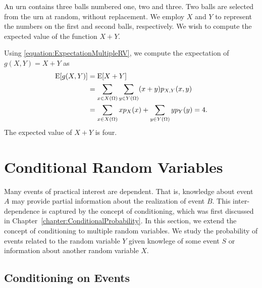 \begin{example}
An urn contains three balls numbered one, two and three.
Two balls are selected from the urn at random, without replacement.
We employ $X$ and $Y$ to represent the numbers on the first and second balls, respectively.
We wish to compute the expected value of the function $X + Y$.

Using \eqref{equation:ExpectationMultipleRV}, we compute the expectation of $g(X,Y) = X + Y$ as
\begin{equation*}
\begin{split}
\mathrm{E} [g(X,Y)] &= \mathrm{E} [X + Y] \\
&= \sum_{x \in X(\Omega)} \sum_{y \in Y(\Omega)} (x + y) p_{X,Y} (x,y) \\
&= \sum_{x \in X(\Omega)} x p_X (x) + \sum_{y \in Y(\Omega)} y p_Y (y)
= 4.
\end{split}
\end{equation*}
The expected value of $X + Y$ is four.
\end{example}


\section{Conditional Random Variables}
\label{section:ConditionalRandomVariables}

Many events of practical interest are dependent.
That is, knowledge about event $A$ may provide partial information about the realization of event $B$.
This inter-dependence is captured by the concept of conditioning, which was first discussed in Chapter~\ref{chapter:ConditionalProbability}.
In this section, we extend the concept of conditioning to multiple random variables.
We study the probability of events related to the random variable $Y$ given knowlege of some event $S$ or information about another random variable $X$.


\subsection{Conditioning on Events}

